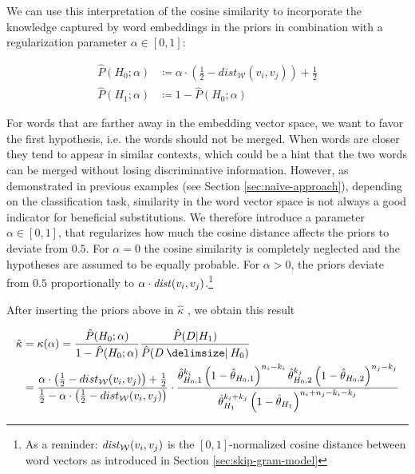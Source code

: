 We can use this interpretation of the cosine similarity to incorporate the
knowledge captured by word embeddings in the priors in combination with 
a regularization parameter $\alpha \in [0,1]$: 

\begin{equation}
\label{eq:priors-alpha}
\begin{split}
	\hat{P}(H_0; \alpha) &\coloneqq \alpha\cdot\left(\frac 1 2 -
	dist_\mathcal{W}(v_i,v_j)\right) + \frac 1 2
	\\
	\hat{P}(H_1; \alpha) &\coloneqq 1 - \hat{P}(H_0; \alpha)
\end{split}
\end{equation}

For words that are farther away in the embedding vector space, we want to
favor the first hypothesis, i.e. the words should not be merged. When
words are closer they tend to appear in similar contexts, which could be a hint
that the two words can be merged without losing discriminative information. 
However, as demonstrated in previous examples (see Section \ref{sec:naive-approach}), 
depending on the classification task, similarity in the word vector space is not always a good indicator for
beneficial substitutions. We therefore introduce a parameter $\alpha \in [0,1]$, that
regularizes how much the cosine distance affects the priors to deviate from 
$0.5$. For $\alpha=0$ the cosine similarity is completely neglected and the hypotheses are assumed to be equally probable. 
For $\alpha > 0$, the priors deviate from $0.5$ proportionally to $\alpha \cdot
\mathit{dist}(v_i,v_j)$.\footnote{As a reminder:
$\mathit{dist}_\mathcal{W}(v_i,v_j)$ is the $[0, 1]$-normalized cosine distance
between word vectors as introduced in Section \ref{sec:skip-gram-model}}

After inserting the priors above in $\hat{\kappa}$ , we obtain this result 

\begin{equation}
\label{eq:bayes-factor-alpha}
\begin{split}
	\hat{\kappa} &= \kappa(\alpha) = \frac{\hat{P}(H_0; \alpha)}{1-\hat{P}(H_0; \alpha)}\frac{\hat{P}(D|H_1)}{\hat{P}(D \given H_0)} \\		
		   &= \frac{\alpha\cdot\left(\frac 1 2 - dist_\mathcal{W}(v_i,v_j)\right) + \frac 1 2}{\frac 1 2 - \alpha\cdot\left(\frac 1 2 - dist_\mathcal{W}(v_i,v_j)\right)} \cdot \frac{\hat{\theta}_{H_0,1}^{k_i}\left(1-\hat{\theta}_{H_0,1}\right)^{n_i-k_i}\hat{\theta}_{H_0,2}^{k_j}\left(1-\hat{\theta}_{H_0,2}\right)^{n_j-k_j}}{\hat{\theta}_{H_1}^{k_i + k_j}\left(1-\hat{\theta}_{H_1}\right)^{n_i + n_j - k_i - k_j}} 
\end{split}
\end{equation}

